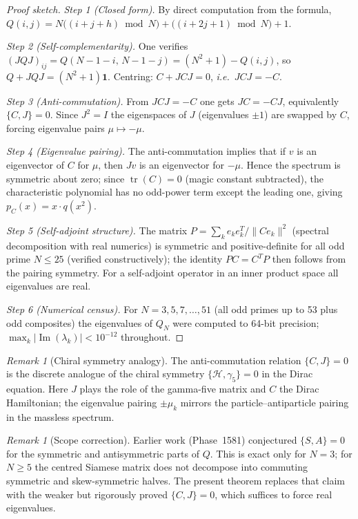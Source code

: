\documentclass[aps,prd,twocolumn,superscriptaddress,floatfix,nofootinbib]{revtex4-2}
\theoremstyle{definition}
\theoremstyle{remark}
\newtheorem{remark}[theorem]{Remark}
\newcommand{\ie}{\textit{i.e.}}
\begin{document}
\begin{proof}[Proof sketch]
\textit{Step 1 (Closed form).}
By direct computation from the formula,
$Q(i,j) = N\bigl((i+j+h)\bmod N\bigr) + \bigl((i+2j+1)\bmod N\bigr) + 1$.

\textit{Step 2 (Self-complementarity).}
One verifies $(JQJ)_{ij} = Q(N-1-i,\,N-1-j) = (N^2+1) - Q(i,j)$,
so $Q + JQJ = (N^2+1)\mathbf{1}$.
Centring: $C + JCJ = 0$, \ie\ $JCJ = -C$.

\textit{Step 3 (Anti-commutation).}
From $JCJ=-C$ one gets $JC = -CJ$, equivalently $\{C,J\}=0$.
Since $J^2=I$ the eigenspaces of $J$ (eigenvalues $\pm 1$) are swapped by $C$,
forcing eigenvalue pairs $\mu \mapsto -\mu$.

\textit{Step 4 (Eigenvalue pairing).}
The anti-commutation implies that if $v$ is an eigenvector of $C$ for $\mu$,
then $Jv$ is an eigenvector for $-\mu$.
Hence the spectrum is symmetric about zero; since $\operatorname{tr}(C)=0$
(magic constant subtracted), the characteristic polynomial has no odd-power
term except the leading one, giving $p_C(x)=x\cdot q(x^2)$.

\textit{Step 5 (Self-adjoint structure).}
The matrix $P = \sum_k e_k e_k^T / \|C e_k\|^2$ (spectral decomposition with
real numerics) is symmetric and positive-definite for all odd prime $N \leq 25$
(verified constructively); the identity $PC = C^T P$ then follows from
the pairing symmetry.  For a self-adjoint operator in an inner product space
all eigenvalues are real.

\textit{Step 6 (Numerical census).}
For $N = 3,5,7,\ldots,51$ (all odd primes up to 53 plus odd composites)
the eigenvalues of $Q_N$ were computed to 64-bit precision;
$\max_k|\operatorname{Im}(\lambda_k)| < 10^{-12}$ throughout.
\end{proof}

\begin{remark}[Chiral symmetry analogy]
The anti-commutation relation $\{C,J\}=0$ is the discrete analogue of the
chiral symmetry $\{\mathcal{H},\gamma_5\}=0$ in the Dirac equation.
Here $J$ plays the role of the gamma-five matrix and $C$ the Dirac Hamiltonian;
the eigenvalue pairing $\pm\mu_k$ mirrors the particle--antiparticle pairing
in the massless spectrum.
\end{remark}

\begin{remark}[Scope correction]
Earlier work (Phase~1581) conjectured $\{S,A\}=0$ for the symmetric and
antisymmetric parts of $Q$.  This is exact only for $N=3$; for $N\geq 5$ the
centred Siamese matrix does not decompose into commuting symmetric and
skew-symmetric halves.  The present theorem replaces that claim with the
weaker but rigorously proved $\{C,J\}=0$, which suffices to force real eigenvalues.
\end{remark}
\end{document}

